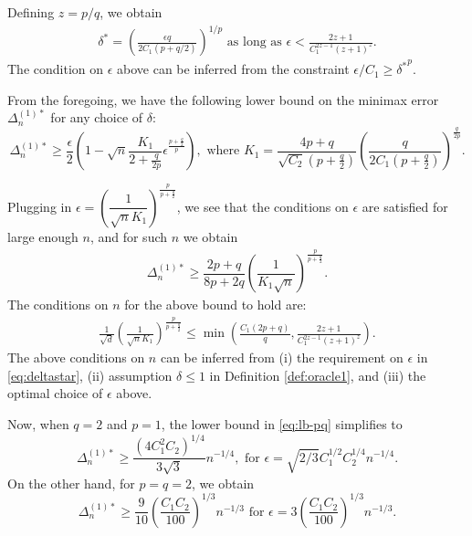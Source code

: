 Defining $z=p/q$, we obtain
\begin{align}
\delta^*=\left(\frac{\epsilon q}{2C_1(p+q/2)}\right)^{1/p} \text{ as long as }\epsilon<\frac{2z+1}{C_1^{2z-1}(z+1)^z}. \label{eq:deltastar}
\end{align}
The condition on $\epsilon$ above can be inferred from the constraint $\epsilon/C_1 \ge {\delta^*}^p$.

From the foregoing, we have the following lower bound on the minimax error $\Delta_n^{(1)*}$ for any choice of $\delta$:
\[
\Delta_n^{(1)*} \ge \dfrac{\epsilon}{2} \left(1 - \sqrt{n}  \dfrac{K_1}{2+\frac{q}{2p}} \epsilon^{\frac{p+\tfrac{q}{2}}{p}}\right), \text{ where } K_1 = \dfrac{4p+q}{\sqrt{C_2}(p+\tfrac{q}{2})} \left(\dfrac{q}{2C_1(p+\tfrac{q}{2})}\right)^{\frac{q}{2p}}.
\]
 
Plugging in $\epsilon = \left(\dfrac{1}{\sqrt{n} K_1} \right)^{\frac{p}{p+\frac{q}{2}}}$, we see that the conditions on $\epsilon$ are satisfied for large enough $n$, and for such $n$ we obtain
\begin{align}
\Delta_n^{(1)*} \ge \dfrac{2p+q}{8p+2q}\left(\dfrac{1}{ K_1 \sqrt n}\right)^{\frac{p}{p+\frac{q}{2}}}.
\label{eq:lb-pq}
\end{align}
The conditions on $n$ for the above bound to hold are:
\begin{align}
\frac{1}{\sqrt{d}}\left(\frac{1}{\sqrt{n} K_1} \right)^{\frac{p}{p+\frac{q}{2}}}\le \min\left( \frac{C_1 (2p+q)}{q}, \frac{2z+1}{C_1^{2z-1}(z+1)^z}\right).
\end{align}
The above conditions on $n$ can be inferred from (i) the requirement on  $\epsilon$ in \eqref{eq:deltastar}, (ii) assumption $\delta \le 1$ in Definition \ref{def:oracle1},  and (iii) the optimal choice of $\epsilon$ above.

Now, when $q=2$ and $p=1$, the lower bound in \eqref{eq:lb-pq} simplifies to
\[
\Delta_n^{(1)*} \ge \dfrac{ (4C_1^2C_2)^{1/4}}{3\sqrt{3}} n^{-1/4}, \text{ for } \epsilon=\sqrt{2/3}C_1^{1/2}C_2^{1/4} n^{-1/4}.
\]
On the other hand, for $p=q=2$, we obtain
\[
\Delta_n^{(1)*} \ge  \frac{9}{10}\left(\frac{C_1 C_2}{100}\right)^{1/3} n^{-1/3} \text{ for } \epsilon=3\left(\frac{C_1 C_2}{100}\right)^{1/3}n^{-1/3}.
\]



